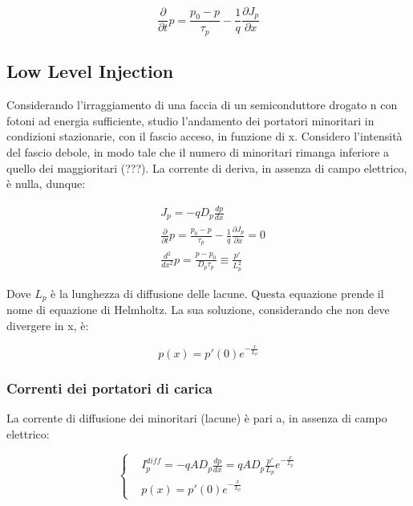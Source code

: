 \documentclass{article}
\begin{document}
\begin{equation}
    \frac{\partial}{\partial t} p= \frac{p_0-p}{\tau_p}- \frac{1}{q}\frac{\partial J_p}{\partial x}
\end{equation}

\subsection{Low Level Injection}
Considerando l'irraggiamento di una faccia di un semiconduttore drogato n con fotoni ad energia sufficiente, studio l'andamento dei portatori minoritari in condizioni stazionarie, con il fascio acceso, in funzione di x.
Considero l'intensità del fascio debole, in modo tale che il numero di minoritari rimanga inferiore a quello dei maggioritari (???).
La corrente di deriva, in assenza di campo elettrico, è nulla, dunque:

\begin{equation}
    \begin{aligned}
         & J_p=-qD_p\frac{dp}{dx}                                                                            \\
         & \frac{\partial}{\partial t} p= \frac{p_0-p}{\tau_p}- \frac{1}{q}\frac{\partial J_p}{\partial x}=0 \\
         & \frac{d^2}{dx^2} p= \frac{p-p_0}{D_p \tau_p}\equiv \frac{p'}{L_p^2}
    \end{aligned}
\end{equation}

Dove $L_p$ è la lunghezza di diffusione delle lacune.
Questa equazione prende il nome di equazione di Helmholtz.
La sua soluzione, considerando che non deve divergere in x, è:

\begin{equation}
    p(x)= p'(0)e^{-\frac{x}{L_p}}
\end{equation}

\subsubsection{Correnti dei portatori di carica}
La corrente di diffusione dei minoritari (lacune) è pari a, in assenza di campo elettrico:

\begin{equation}
    \left\{
    \begin{aligned}
         & I^{diff}_p= -qAD_p \frac{dp}{dx}= qAD_p \frac{p'}{L_p}e^{-\frac{x}{L_p}} \\
         & p(x)= p'(0)e^{-\frac{x}{L_p}}
    \end{aligned}
    \right.
\end{equation}
\end{document}
